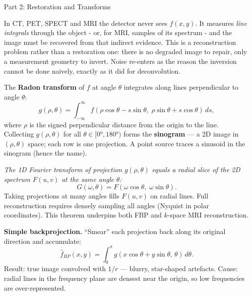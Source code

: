 \documentclass[letterpaper]{article}
\begin{document}
\begin{notes}{Part 2: Restoration and Transforms}

In CT, PET, SPECT and MRI the detector never sees $f(x,y)$. It measures \emph{line integrals} through the object - or, for MRI, samples of its spectrum - and the image must be recovered from that indirect evidence. This is a reconstruction problem rather than a restoration one: there is no degraded image to repair, only a measurement geometry to invert. Noise re-enters as the reason the inversion cannot be done naively, exactly as it did for deconvolution.


The \textbf{Radon transform} of $f$ at angle $\theta$ integrates along lines perpendicular to angle $\theta$:
$$g(\rho,\theta) = \int_{-\infty}^{\infty} f(\rho\cos\theta - s\sin\theta,\;\rho\sin\theta + s\cos\theta)\,ds,$$
where $\rho$ is the signed perpendicular distance from the origin to the line. Collecting $g(\rho,\theta)$ for all $\theta\in[0°,180°)$ forms the \textbf{sinogram} — a 2D image in $(\rho,\theta)$ space; each row is one projection. A point source traces a sinusoid in the sinogram (hence the name).


\textit{The 1D Fourier transform of projection $g(\rho,\theta)$ equals a radial slice of the 2D spectrum $F(u,v)$ at the same angle $\theta$:}
$$G(\omega,\theta) = F(\omega\cos\theta,\;\omega\sin\theta).$$
Taking projections at many angles fills $F(u,v)$ on radial lines. Full reconstruction requires densely sampling all angles (Nyquist in polar coordinates). This theorem underpins both FBP and $k$-space MRI reconstruction.


\textbf{Simple backprojection.} ``Smear'' each projection back along its original direction and accumulate:
$$\hat{f}_{BP}(x,y) = \int_0^\pi g(x\cos\theta+y\sin\theta,\,\theta)\,d\theta.$$
Result: true image convolved with $1/r$ — blurry, star-shaped artefacts. Cause: radial lines in the frequency plane are densest near the origin, so low frequencies are over-represented.


\end{notes}
\end{document}
